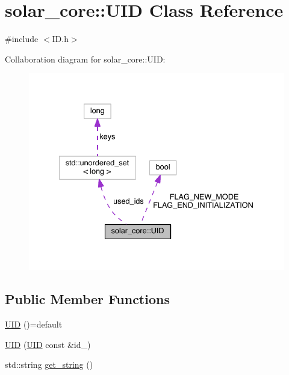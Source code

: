 \hypertarget{classsolar__core_1_1_u_i_d}{}\section{solar\+\_\+core\+:\+:U\+I\+D Class Reference}
\label{classsolar__core_1_1_u_i_d}


{\ttfamily \#include $<$I\+D.\+h$>$}



Collaboration diagram for solar\+\_\+core\+:\+:U\+I\+D\+:
\nopagebreak
\begin{figure}[H]
\begin{center}
\leavevmode
\includegraphics[width=335pt]{classsolar__core_1_1_u_i_d__coll__graph}
\end{center}
\end{figure}
\subsection*{Public Member Functions}
\begin{DoxyCompactItemize}
\item 
\hyperlink{classsolar__core_1_1_u_i_d_af5d790831cd429becae2f5143b0f8e92}{U\+I\+D} ()=default
\item 
\hyperlink{classsolar__core_1_1_u_i_d_a23f8078dea147aecd914d1676f09a98a}{U\+I\+D} (\hyperlink{classsolar__core_1_1_u_i_d}{U\+I\+D} const \&id\+\_\+)
\item 
std\+::string \hyperlink{classsolar__core_1_1_u_i_d_a4d0f76d77dd4d4fa9ebcb85e31cd9209}{get\+\_\+string} ()
\end{DoxyCompactItemize}
